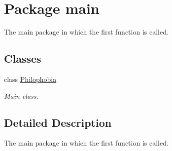 \hypertarget{a00085}{\section{Package main}
\label{a00085}
}


The main package in which the first function is called.  


\subsection*{Classes}
\begin{DoxyCompactItemize}
\item 
class \hyperlink{a00017}{Philophobia}
\begin{DoxyCompactList}\small\item\em Main class. \end{DoxyCompactList}\end{DoxyCompactItemize}


\subsection{Detailed Description}
The main package in which the first function is called. 